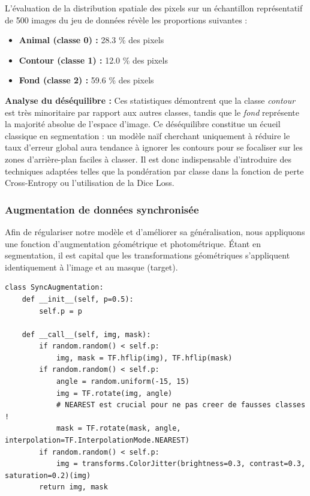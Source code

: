\documentclass[12pt, a4paper]{article}
\begin{document}
L'évaluation de la distribution spatiale des pixels sur un échantillon représentatif de 500 images du jeu de données révèle les proportions suivantes :
\begin{itemize}
    \item \textbf{Animal (classe 0) :} 28.3 \% des pixels
    \item \textbf{Contour (classe 1) :} 12.0 \% des pixels
    \item \textbf{Fond (classe 2) :} 59.6 \% des pixels
\end{itemize}

\textbf{Analyse du déséquilibre :} 
Ces statistiques démontrent que la classe \textit{contour} est très minoritaire par rapport aux autres classes, tandis que le \textit{fond} représente la majorité absolue de l'espace d'image. Ce déséquilibre constitue un écueil classique en segmentation : un modèle naïf cherchant uniquement à réduire le taux d'erreur global aura tendance à ignorer les contours pour se focaliser sur les zones d'arrière-plan faciles à classer. Il est donc indispensable d'introduire des techniques adaptées telles que la pondération par classe dans la fonction de perte Cross-Entropy ou l'utilisation de la Dice Loss.

\subsubsection*{Augmentation de données synchronisée}
Afin de régulariser notre modèle et d'améliorer sa généralisation, nous appliquons une fonction d'augmentation géométrique et photométrique. Étant en segmentation, il est capital que les transformations géométriques s'appliquent identiquement à l'image et au masque (target).

\begin{lstlisting}[caption={Implémentation de l'augmentation synchronisée}]
class SyncAugmentation:
    def __init__(self, p=0.5):
        self.p = p

    def __call__(self, img, mask):
        if random.random() < self.p:
            img, mask = TF.hflip(img), TF.hflip(mask)
        if random.random() < self.p:
            angle = random.uniform(-15, 15)
            img = TF.rotate(img, angle)
            # NEAREST est crucial pour ne pas creer de fausses classes !
            mask = TF.rotate(mask, angle, interpolation=TF.InterpolationMode.NEAREST)
        if random.random() < self.p:
            img = transforms.ColorJitter(brightness=0.3, contrast=0.3, saturation=0.2)(img)
        return img, mask
\end{lstlisting}
\end{document}
